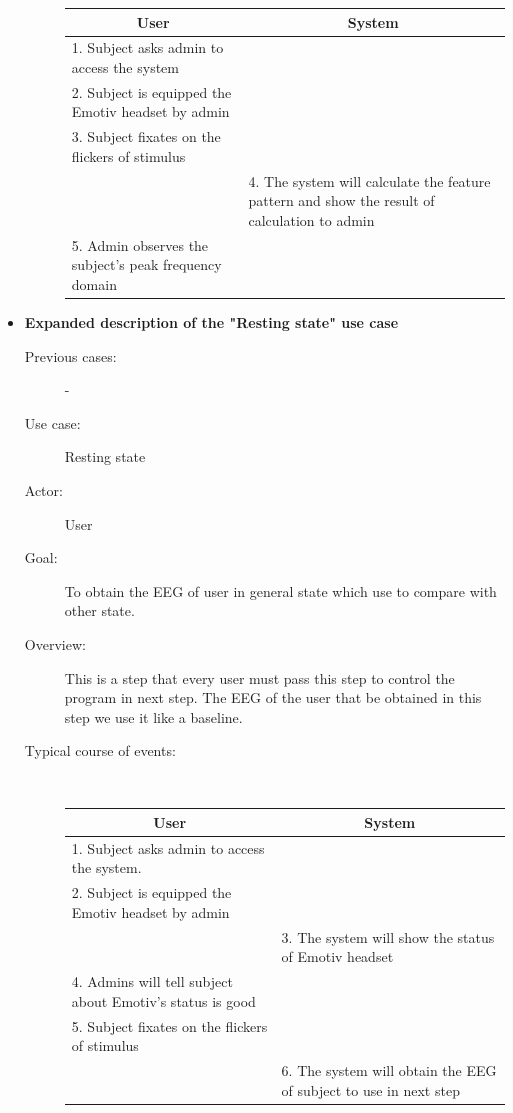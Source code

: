 \begin{itemize}
\begin{description}
	{
		\centering
		
		\begin{tabular}{| m{.47\linewidth} | m{.47\linewidth} |}
			
			\hline 
			\multicolumn{1}{|c}{\textbf{User}} & 
  			\multicolumn{1}{|c|}{\textbf{System}}\\
			\hline 
			1. Subject asks admin to access the system &   \\
			\hline 
			2. Subject is equipped the Emotiv headset by admin  &   \\
			\hline 
			3. Subject fixates on the flickers of stimulus & \\
			\hline 
			& 4. The system will calculate the feature pattern and show the result of calculation to admin  \\
			\hline
			5. Admin observes the subject's peak frequency domain & \\
			\hline
			
		\end{tabular}
	}
	
\end{description}

\newpage
\item \textbf{Expanded description of the "Resting state" use case }
\begin{description}
	\item [Previous cases:] -
	\item [Use case:] Resting state
	\item [Actor:] User  
	\item [Goal:] To obtain the EEG of user in general state which use to compare with other state. 
	\item [Overview:] This is a step that every user must pass this step to control the program in next step. The EEG of the user that be obtained in this step we use it like a baseline. 
	\item [Typical course of events:]~
	
	{
		\centering
		\begin{tabular}{| m{.47\linewidth} | m{.47\linewidth} |}
			
			\hline 
			\multicolumn{1}{|c}{\textbf{User}} & 
  			\multicolumn{1}{|c|}{\textbf{System}}\\
			\hline 
			1. Subject asks admin to access the system. &   \\
			\hline 
			2. Subject is equipped the Emotiv headset by admin   &   \\
			\hline 
			& 3. The system will show the status of Emotiv headset \\
			\hline 
			4. Admins will tell subject about Emotiv's status is good &  \\
			\hline
			5. Subject fixates on the flickers of stimulus &  \\
			\hline
			& 6. The system will obtain the EEG of subject to use in next step\\
			\hline
			

\end{tabular}}
\end{description}
\end{itemize}
